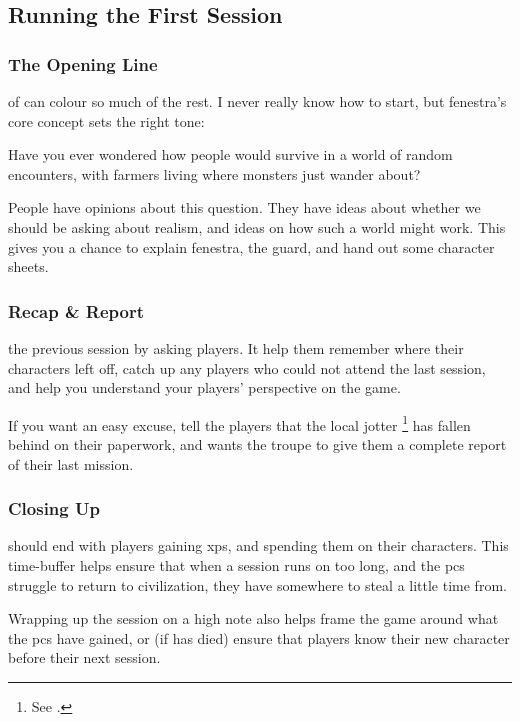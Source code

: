 \begin{multicols}{2}
\subsection{Running the First Session}

\subsubsection{The Opening Line}
of  can colour so much of the rest.
I never really know how to start, but \gls{fenestra}'s core concept sets the right tone:

\begin{speechtext}
  Have you ever wondered how people would survive in a world of random encounters, with farmers living where monsters just wander about?
\end{speechtext}

People have opinions about this question.
They have ideas about whether we should be asking about realism, and ideas on how such a world might work.
This gives you a chance to explain \gls{fenestra}, the \gls{guard}, and hand out some character sheets.

\subsubsection{Recap \& Report}
the previous session by asking players.
It help them remember where their characters left off, catch up any players who could not attend the last session, and help you understand your players' perspective on the game.

If you want an easy excuse, tell the players that the local \gls{jotter}%
\footnote{See .}
has fallen behind on their paperwork, and wants the troupe to give them a complete report of their last mission.

\subsubsection{Closing Up}
should end with players gaining \glspl{xp}, and spending them on their characters.
This time-buffer helps ensure that when a session runs on too long, and the \glspl{pc} struggle to return to civilization, they have somewhere to steal a little time from.

Wrapping up the session on a high note also helps frame the game around what the \glspl{pc} have gained, or (if  has died) ensure that players know their new character before their next session.


\end{multicols}
